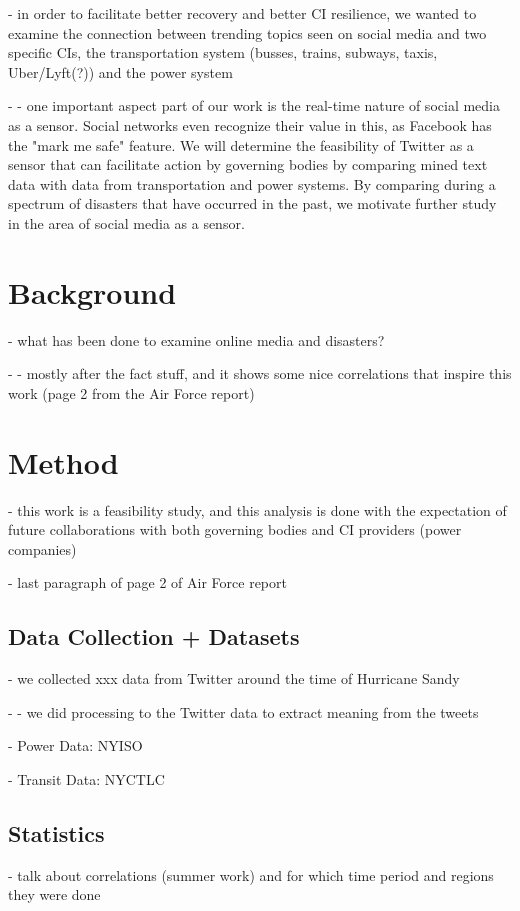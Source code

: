 \documentclass[]{interact}
\theoremstyle{plain}%
\theoremstyle{definition}
\theoremstyle{remark}
\begin{document}
    - in order to facilitate better recovery and better CI resilience, we wanted to examine the connection between trending topics seen on social media and two specific CIs, the transportation system (busses, trains, subways, taxis, Uber/Lyft(?)) and the power system

    - - one important aspect part of our work is the real-time nature of social media as a sensor.  Social networks even recognize their value in this, as Facebook has the "mark me safe" feature.  We will determine the feasibility of Twitter as a sensor that can facilitate action by governing bodies by comparing mined text data with data from transportation and power systems.  By comparing during a spectrum of disasters that have occurred in the past, we motivate further study in the area of social media as a sensor.

    \section{Background}
    - what has been done to examine online media and disasters?

    - - mostly after the fact stuff, and it shows some nice correlations that inspire this work (page 2 from the Air Force report)


    \section{Method}
    - this work is a feasibility study, and this analysis is done with the expectation of future collaborations with both governing bodies and CI providers (power companies)

    - last paragraph of page 2 of Air Force report

    \subsection{Data Collection + Datasets}
    - we collected xxx data from Twitter around the time of Hurricane Sandy

    - - we did processing to the Twitter data to extract meaning from the tweets


    - Power Data: NYISO

    - Transit Data: NYCTLC

    \subsection{Statistics}
    - talk about correlations (summer work) and for which time period and regions they were done
\end{document}
